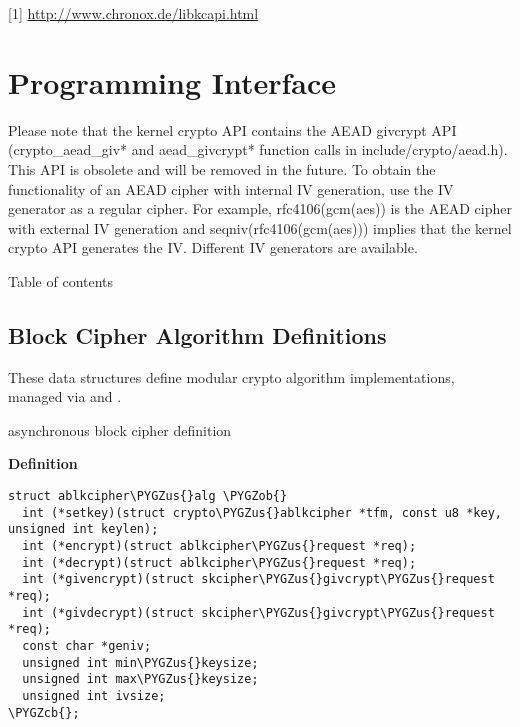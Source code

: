 \documentclass[a4paper,8pt,english]{sphinxmanual}
\def\PYGZus{\char`\_}
\def\PYGZob{\char`\{}
\def\PYGZcb{\char`\}}
\begin{document}
{[}1{]} \href{http://www.chronox.de/libkcapi.html}{http://www.chronox.de/libkcapi.html}


\chapter{Programming Interface}
\label{crypto/api:programming-interface}\label{crypto/api::doc}
Please note that the kernel crypto API contains the AEAD givcrypt API
(crypto\_aead\_giv* and aead\_givcrypt* function calls in
include/crypto/aead.h). This API is obsolete and will be removed in the
future. To obtain the functionality of an AEAD cipher with internal IV
generation, use the IV generator as a regular cipher. For example,
rfc4106(gcm(aes)) is the AEAD cipher with external IV generation and
seqniv(rfc4106(gcm(aes))) implies that the kernel crypto API generates
the IV. Different IV generators are available.

Table of contents


\section{Block Cipher Algorithm Definitions}
\label{crypto/api-skcipher::doc}\label{crypto/api-skcipher:block-cipher-algorithm-definitions}
These data structures define modular crypto algorithm implementations,
managed via  and .

\begin{fulllineitems}
\label{crypto/api-skcipher:c.ablkcipher_alg}
asynchronous block cipher definition

\end{fulllineitems}


\textbf{Definition}

\begin{Verbatim}[commandchars=\\\{\}]
struct ablkcipher\PYGZus{}alg \PYGZob{}
  int (*setkey)(struct crypto\PYGZus{}ablkcipher *tfm, const u8 *key, unsigned int keylen);
  int (*encrypt)(struct ablkcipher\PYGZus{}request *req);
  int (*decrypt)(struct ablkcipher\PYGZus{}request *req);
  int (*givencrypt)(struct skcipher\PYGZus{}givcrypt\PYGZus{}request *req);
  int (*givdecrypt)(struct skcipher\PYGZus{}givcrypt\PYGZus{}request *req);
  const char *geniv;
  unsigned int min\PYGZus{}keysize;
  unsigned int max\PYGZus{}keysize;
  unsigned int ivsize;
\PYGZcb{};
\end{Verbatim}
\end{document}
